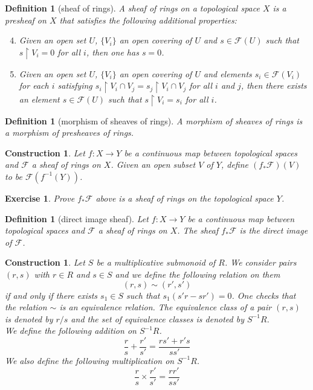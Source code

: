 \documentclass[12pt]{article}
\newtheorem{definition}[proposition]{Definition}
\newtheorem{ex}[proposition]{Exercise}
\newtheorem{cons}[proposition]{Construction}
\begin{document}
\begin{definition}[sheaf of rings]
	A sheaf of rings on a topological space $X$ is a presheaf on $X$ that satisfies the following additional properties:
	\begin{enumerate}
	\setcounter{enumi}{3}
		\item Given an open set $U$, $\lbrace V_i \rbrace$ an open covering of $U$ and $s \in \mathscr{F}(U)$ such that $s \restriction V_i = 0$ for all $i$, then one has $s = 0$.
		\item Given an open set $U$, $\lbrace V_i \rbrace$ an open covering of $U$ and elements $s_i \in \mathscr{F}(V_i)$ for each $i$ satisfying $s_i \restriction V_i \cap V_j = s_j \restriction V_i \cap V_j$ for all $i$ and $j$, then there exists an element $s \in \mathscr{F}(U)$ such that $s \restriction V_i = s_i$ for all $i$.  
	\end{enumerate}	
\end{definition}

\begin{definition}[morphism of sheaves of rings]
	A morphism of sheaves of rings is a morphism of presheaves of rings.
\end{definition}	

\begin{cons}
	Let $f: X \rightarrow Y$ be a continuous map between topological spaces and $\mathscr{F}$ a sheaf of rings on $X$. Given an open subset $V$ of $Y$, define $(f_{*} \mathscr{F})(V)$ to be $\mathscr{F} (f^{-1}(Y))$.  
\end{cons}

\begin{ex}
	Prove $f_{*} \mathscr{F}$ above is a sheaf of rings on the topological space $Y$.  
\end{ex}

\begin{definition}[direct image sheaf]
	Let $f: X \rightarrow Y$ be a continuous map between topological spaces and $\mathscr{F}$ a sheaf of rings on $X$. The sheaf $f_{*} \mathscr{F}$ is the direct image of $\mathscr{F}$. 
\end{definition}		

\begin{cons}
	Let $S$ be a multiplicative submonoid of $R$. We consider pairs $(r, s)$ with $r \in R$ and $s \in S$ and we define the following relation on them
	\[
	(r, s) \sim (r', s')
	\]
	if and only if there exists $s_1 \in S$ such that $s_1(s' r - s r') = 0$. One checks that the relation $\sim$ is an equivalence relation. The equivalence class of a pair $(r, s)$ is denoted by $r/s$ and the set of equivalence classes is denoted by $S^{-1} R$. \\
	We define the following addition on $S^{-1} R$.
	\[
	\frac{r}{s} + \frac{r'}{s'} = \frac{r s' + r' s}{s s'}
	\]
	We also define the following multiplication on $S^{-1} R$. 
	\[
	\frac{r}{s} \times \frac{r'}{s'} = \frac{r r'}{s s'}
	\]
\end{cons}
\end{document}
